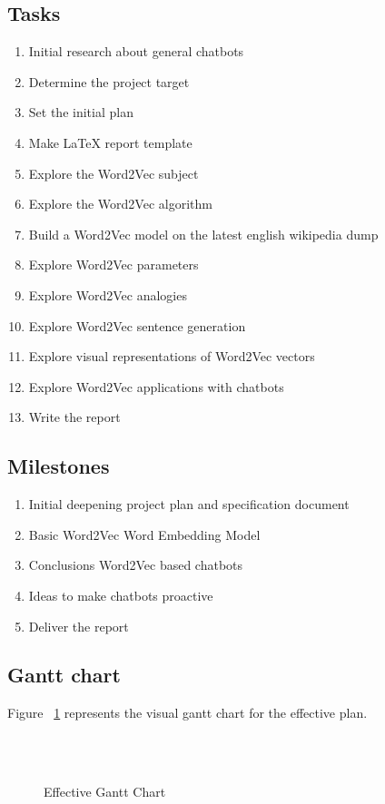 \subsection{Tasks}
\begin{enumerate}
    \setlength\itemsep{0em}
    \item Initial research about general chatbots
    \item Determine the project target
    \item Set the initial plan
    \item Make LaTeX report template
    \item Explore the Word2Vec subject
    \item Explore the Word2Vec algorithm
    \item Build a Word2Vec model on the latest english wikipedia dump
    \item Explore Word2Vec parameters
    \item Explore Word2Vec analogies
    \item Explore Word2Vec sentence generation
    \item Explore visual representations of Word2Vec vectors
    \item Explore Word2Vec applications with chatbots
    \item Write the report
    
\end{enumerate}

\subsection{Milestones}
\begin{enumerate}
    \setlength\itemsep{0em}
    \item Initial deepening project plan and specification document
    \item Basic Word2Vec Word Embedding Model
    \item Conclusions Word2Vec based chatbots
    \item Ideas to make chatbots proactive
    \item Deliver the report
\end{enumerate}

\subsection{Gantt chart}
Figure ~\ref{fig:gantt-effective} represents the visual gantt chart for the effective plan.

\begin{figure}[h]%
\centering
\begin{ganttchart}{1}{16}
\\
\\

\end{ganttchart}

\caption{Effective Gantt Chart}
\label{fig:gantt-effective}
\end{figure}
